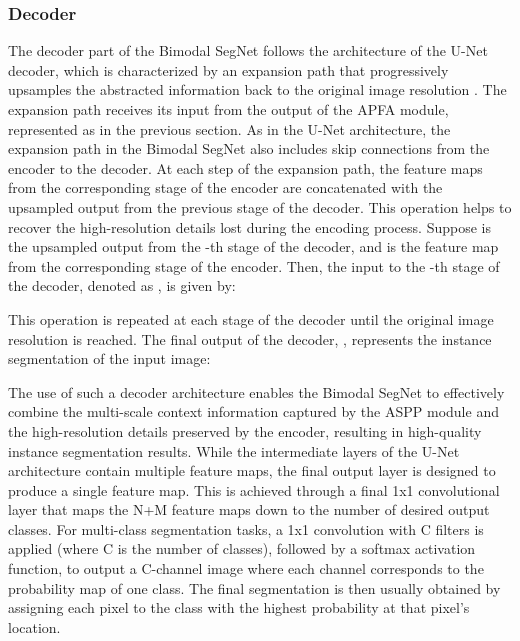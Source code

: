\documentclass[lettersize,journal]{IEEEtran}
\begin{document}
\subsubsection{\textbf{Decoder }}
\label{subsubsection : Decoder}


The decoder part of the Bimodal SegNet follows the architecture of the U-Net decoder, which is characterized by an expansion path that progressively upsamples the abstracted information back to the original image resolution \cite{Huang2022CM-UNet:Scenes}. The expansion path receives its input from the output of the APFA module, represented as  in the previous section. As in the U-Net architecture, the expansion path in the Bimodal SegNet also includes skip connections from the encoder to the decoder. At each step of the expansion path, the feature maps from the corresponding stage of the encoder are concatenated with the upsampled output from the previous stage of the decoder. This operation helps to recover the high-resolution details lost during the encoding process. Suppose  is the upsampled output from the -th stage of the decoder, and  is the feature map from the corresponding stage of the encoder. Then, the input to the -th stage of the decoder, denoted as , is given by:



This operation is repeated at each stage of the decoder until the original image resolution is reached. The final output of the decoder, , represents the instance segmentation of the input image:



The use of such a decoder architecture enables the Bimodal SegNet to effectively combine the multi-scale context information captured by the ASPP module and the high-resolution details preserved by the encoder, resulting in high-quality instance segmentation results. While the intermediate layers of the U-Net architecture contain multiple feature maps, the final output layer is designed to produce a single feature map. This is achieved through a final 1x1 convolutional layer that maps the N+M feature maps down to the number of desired output classes. For multi-class segmentation tasks, a 1x1 convolution with C filters is applied (where C is the number of classes), followed by a softmax activation function, to output a C-channel image where each channel corresponds to the probability map of one class. The final segmentation is then usually obtained by assigning each pixel to the class with the highest probability at that pixel's location.
\end{document}
